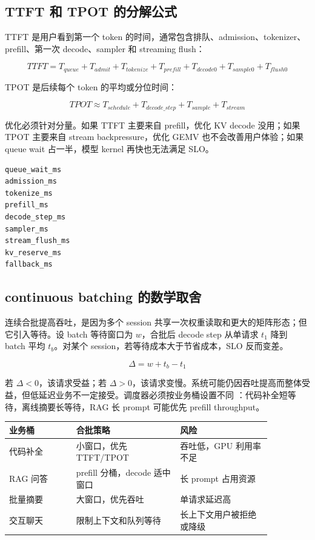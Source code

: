 \subsection{TTFT 和 TPOT 的分解公式}

TTFT 是用户看到第一个 token 的时间，通常包含排队、admission、tokenizer、prefill、第一次 decode、sampler 和 streaming flush：

\[
TTFT = T_{queue} + T_{admit} + T_{tokenize} + T_{prefill} + T_{decode0} + T_{sample0} + T_{flush0}
\]

TPOT 是后续每个 token 的平均或分位时间：

\[
TPOT \approx T_{schedule} + T_{decode\_step} + T_{sample} + T_{stream}
\]

优化必须针对分量。如果 TTFT 主要来自 prefill，优化 KV decode 没用；如果 TPOT 主要来自 stream backpressure，优化 GEMV 也不会改善用户体验；如果 queue wait 占一半，模型 kernel 再快也无法满足 SLO。

\begin{lstlisting}[numbers=none,caption={SLO trace 必须拆分的阶段}]
queue_wait_ms
admission_ms
tokenize_ms
prefill_ms
decode_step_ms
sampler_ms
stream_flush_ms
kv_reserve_ms
fallback_ms
\end{lstlisting}

\subsection{continuous batching 的数学取舍}

连续合批提高吞吐，是因为多个 session 共享一次权重读取和更大的矩阵形态；但它引入等待。设 batch 等待窗口为 \(w\)，合批后 decode step 从单请求 \(t_1\) 降到 batch 平均 \(t_b\)。对某个 session，若等待成本大于节省成本，SLO 反而变差。

\[
\Delta = w + t_b - t_1
\]

若 \(\Delta < 0\)，该请求受益；若 \(\Delta > 0\)，该请求变慢。系统可能仍因吞吐提高而整体受益，但低延迟业务不一定接受。调度器必须按业务桶设置不同 ：代码补全短等待，离线摘要长等待，RAG 长 prompt 可能优先 prefill throughput。

\begin{center}
\begin{tabular}{p{0.22\linewidth}p{0.34\linewidth}p{0.30\linewidth}}
\toprule
业务桶 & 合批策略 & 风险 \\
\midrule
代码补全 & 小窗口，优先 TTFT/TPOT & 吞吐低，GPU 利用率不足 \\
RAG 问答 & prefill 分桶，decode 适中窗口 & 长 prompt 占用资源 \\
批量摘要 & 大窗口，优先吞吐 & 单请求延迟高 \\
交互聊天 & 限制上下文和队列等待 & 长上下文用户被拒绝或降级 \\
\bottomrule
\end{tabular}
\end{center}

